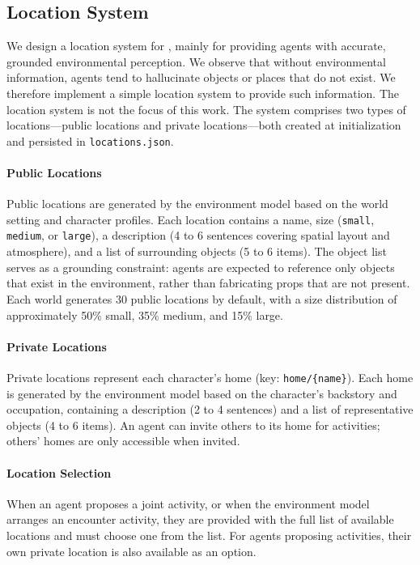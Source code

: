 \subsection{Location System}
\label{sec:appendix_location}

We design a location system for \method, mainly for providing agents with accurate, grounded environmental perception.
We observe that without environmental information, agents tend to hallucinate objects or places that do not exist.
We therefore implement a simple location system to provide such information.
The location system is not the focus of this work.
The system comprises two types of locations---public locations and private locations---both
created at initialization and persisted in \texttt{locations.json}.

\paragraph{Public Locations}
Public locations are generated by the environment model based on the world setting and character profiles.
Each location contains a name, size (\texttt{small}, \texttt{medium}, or \texttt{large}),
a description (4 to 6 sentences covering spatial layout and atmosphere),
and a list of surrounding objects (5 to 6 items).
The object list serves as a grounding constraint:
agents are expected to reference only objects that exist in the environment,
rather than fabricating props that are not present.
Each world generates 30 public locations by default,
with a size distribution of approximately 50\% small, 35\% medium, and 15\% large.

\paragraph{Private Locations}
Private locations represent each character's home (key: \texttt{home/\{name\}}).
Each home is generated by the environment model based on the character's backstory and occupation,
containing a description (2 to 4 sentences) and a list of representative objects (4 to 6 items).
An agent can invite others to its home for activities;
others' homes are only accessible when invited.

\paragraph{Location Selection}
When an agent proposes a joint activity, or when the environment model arranges an encounter activity,
they are provided with the full list of available locations and must choose one from the list.
For agents proposing activities, their own private location is also available as an option.

